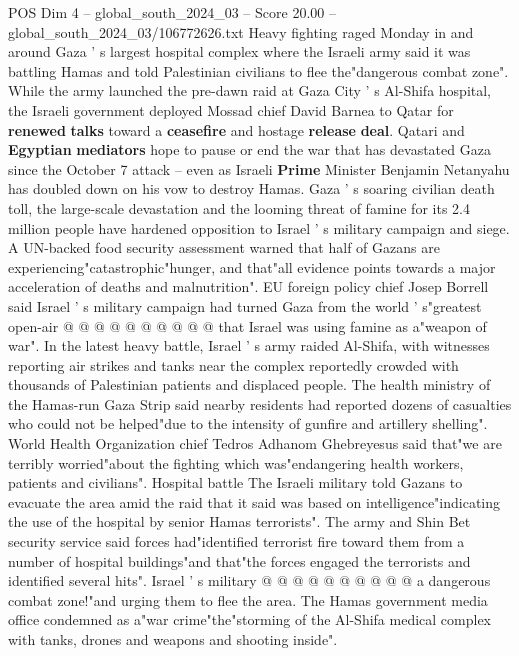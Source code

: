\begin{textsample}{POS Dim 4 – global\_south\_2024\_03 – Score 20.00 – global\_south\_2024\_03/106772626.txt}  \label{ex:f4_pos_104}
Heavy fighting raged Monday in and around Gaza ' s largest hospital complex where the Israeli army said it was battling Hamas and told Palestinian civilians to flee the"dangerous combat zone".
While the army launched the pre-dawn raid at Gaza City ' s Al-Shifa hospital, the Israeli government deployed Mossad chief David Barnea to Qatar for \textbf{renewed} \textbf{talks} toward a \textbf{ceasefire} and hostage \textbf{release} \textbf{deal}.
Qatari and \textbf{Egyptian} \textbf{mediators} hope to pause or end the war that has devastated Gaza since the October 7 attack -- even as Israeli \textbf{Prime} Minister Benjamin Netanyahu has doubled down on his vow to destroy Hamas.
Gaza ' s soaring civilian death toll, the large-scale devastation and the looming threat of famine for its 2.4 million people have hardened opposition to Israel ' s military campaign and siege.
A UN-backed food security assessment warned that half of Gazans are experiencing"catastrophic"hunger, and that"all evidence points towards a major acceleration of deaths and malnutrition".
EU foreign policy chief Josep Borrell said Israel ' s military campaign had turned Gaza from the world ' s"greatest open-air @ @ @ @ @ @ @ @ @ @ that Israel was using famine as a"weapon of war".
In the latest heavy battle, Israel ' s army raided Al-Shifa, with witnesses reporting air strikes and tanks near the complex reportedly crowded with thousands of Palestinian patients and displaced people.
The health ministry of the Hamas-run Gaza Strip said nearby residents had reported dozens of casualties who could not be helped"due to the intensity of gunfire and artillery shelling".
World Health Organization chief Tedros Adhanom Ghebreyesus said that"we are terribly worried"about the fighting which was"endangering health workers, patients and civilians".
Hospital battle The Israeli military told Gazans to evacuate the area amid the raid that it said was based on intelligence"indicating the use of the hospital by senior Hamas terrorists".
The army and Shin Bet security service said forces had"identified terrorist fire toward them from a number of hospital buildings"and that"the forces engaged the terrorists and identified several hits".
Israel ' s military @ @ @ @ @ @ @ @ @ @ a dangerous combat zone!"and urging them to flee the area.
The Hamas government media office condemned as a"war crime"the"storming of the Al-Shifa medical complex with tanks, drones and weapons and shooting inside".

\end{textsample}
